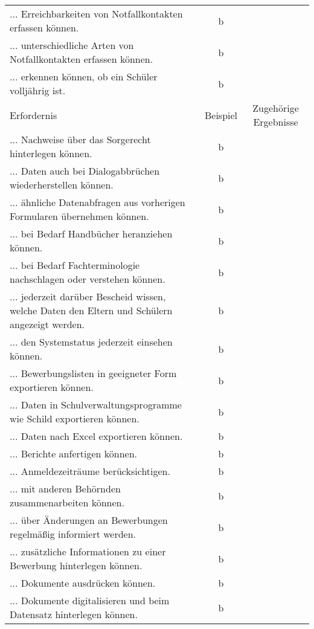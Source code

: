 \begin{landscape}
\begin{longtable}{p{15cm}cc}
            ... Erreichbarkeiten von Notfallkontakten erfassen können. & b \\
            ... unterschiedliche Arten von Notfallkontakten erfassen können. & b \\
            ... erkennen können, ob ein Schüler volljährig ist. & b \\
        \endfirsthead
        \toprule
        Erfordernis & Beispiel & Zugehörige Ergebnisse \\
        \midrule
        \endhead
        \bottomrule
        \endfoot
            ... Nachweise über das Sorgerecht hinterlegen können. & b \\
            ... Daten auch bei Dialogabbrüchen wiederherstellen können. & b \\
            ... ähnliche Datenabfragen aus vorherigen Formularen übernehmen können. & b \\
            ... bei Bedarf Handbücher heranziehen können. & b \\
            ... bei Bedarf Fachterminologie nachschlagen oder verstehen können. & b \\
            ... jederzeit darüber Bescheid wissen, welche Daten den Eltern und Schülern angezeigt werden. & b \\
            ... den Systemstatus jederzeit einsehen können. & b \\
            ... Bewerbungslisten in geeigneter Form exportieren können. & b \\
            ... Daten in Schulverwaltungsprogramme wie Schild exportieren können. & b \\
            ... Daten nach Excel exportieren können. & b \\
            ... Berichte anfertigen können. & b \\
            ... Anmeldezeiträume berücksichtigen. & b \\
            ... mit anderen Behörnden zusammenarbeiten können. & b \\
            ... über Änderungen an Bewerbungen regelmäßig informiert werden. & b \\
            ... zusätzliche Informationen zu einer Bewerbung hinterlegen können. & b \\
            ... Dokumente ausdrücken können. & b \\
            ... Dokumente digitalisieren und beim Datensatz hinterlegen können. & b \\
    \end{longtable}





\end{landscape}

